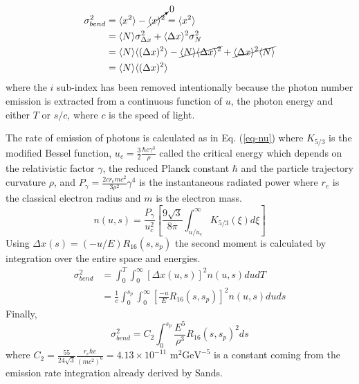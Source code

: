 \begin{align}
\sigma^2_{bend} &= \langle x^2\rangle - \cancelto{0}{\langle x\rangle^2} = \langle x^2 \rangle\label{eq-bsize}\\
 &= \langle N\rangle \sigma^2_{\Delta x} + \langle \Delta x \rangle ^2 \sigma_N^2\notag\\
 &= \langle N\rangle \langle (\Delta x)^2\rangle -\cancel{\langle N\rangle\langle\Delta x\rangle^2} + \cancel{\langle \Delta x \rangle^2\langle N \rangle}\notag\\
 &=\langle N\rangle \langle (\Delta x)^2\rangle\notag
\end{align}
where the $i$ sub-index has been removed intentionally because the photon number emission is extracted from a continuous function of $u$, the photon energy and either $T$ or $s/c$, where $c$ is the speed of light.\par 
The rate of emission of photons is calculated as in Eq. (\ref{eq-nu}) where $K_{5/3}$ is the modified Bessel function, $u_c=\frac{3}{2}\frac{\hbar c \gamma^3}{\rho}$ called the critical energy which depends on the relativistic factor $\gamma$, the reduced Planck constant $\hbar$ and the particle trajectory curvature $\rho$, and $P_\gamma=\frac{2cr_emc^2}{3\rho^2}\gamma^4$ is the instantaneous radiated power where $r_e$ is the classical electron radius and $m$ is the electron mass.
\begin{equation}
n(u,s)=\frac{P_\gamma}{u_c^2}\left[\frac{9\sqrt{3}}{8\pi}\int_{u/u_c}^\infty K_{5/3}(\xi) d\xi\right]\label{eq-nu}
\end{equation}
Using $\Delta x(s) = (-u/E) R_{16}(s,s_p)$ the second moment is calculated by integration over the entire space and energies.
\begin{align}
 \sigma_{bend}^2&=\int_0^{T} \int_0^\infty [\Delta x(u,s)]^2 n(u,s)dudT\label{eqDeltaX}\\
 &=\frac{1}{c}\int_0^{s_p} \int_0^\infty \left[\frac{-u}{E}R_{16}(s,s_p)\right]^2 n(u,s)duds
\end{align}
Finally, 
\begin{equation}
\sigma^2_{bend}=C_2\int_0^{s_p} \frac{E^5}{\rho^3}R_{16}(s,s_p)^2 ds\label{eq-R16}
\end{equation}
where $C_2=\frac{55}{24\sqrt{3}}\frac{r_e\hbar c}{(mc^2)^6}=4.13\times10^{-11} \text{ m}^2\text{GeV}^{-5}$ is a constant coming from the emission rate integration already derived by Sands.\par

